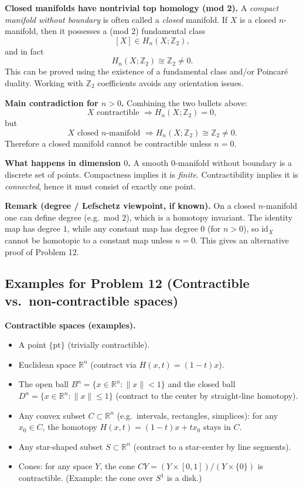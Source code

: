 \documentclass[12pt,a4paper]{article}
\theoremstyle{plain}
\theoremstyle{definition}      %
\begin{document}
\medskip
\noindent\textbf{Closed manifolds have nontrivial top homology (mod 2).}
A \emph{compact manifold without boundary} is often called a \emph{closed} manifold.
If $X$ is a closed $n$-manifold, then it possesses a (mod $2$) fundamental class
\[
[X]\in H_n(X;\mathbb{Z}_2),
\]
and in fact
\[
H_n(X;\mathbb{Z}_2)\cong \mathbb{Z}_2 \neq 0.
\]
This can be proved using the existence of a fundamental class and/or Poincar\'e duality.
Working with $\mathbb{Z}_2$ coefficients avoids any orientation issues.

\medskip
\noindent\textbf{Main contradiction for $n>0$.}
Combining the two bullets above:
\[
X \text{ contractible } \Longrightarrow H_n(X;\mathbb{Z}_2)=0,
\]
but
\[
X \text{ closed $n$-manifold } \Longrightarrow H_n(X;\mathbb{Z}_2)\cong\mathbb{Z}_2\neq 0.
\]
Therefore a closed manifold cannot be contractible unless $n=0$.

\medskip
\noindent\textbf{What happens in dimension $0$.}
A smooth $0$-manifold without boundary is a discrete set of points.
Compactness implies it is \emph{finite}.
Contractibility implies it is \emph{connected}, hence it must consist of exactly one point.

\medskip
\noindent\textbf{Remark (degree / Lefschetz viewpoint, if known).}
On a closed $n$-manifold one can define degree (e.g.\ mod $2$), which is a homotopy invariant.
The identity map has degree $1$, while any constant map has degree $0$ (for $n>0$),
so $\mathrm{id}_X$ cannot be homotopic to a constant map unless $n=0$.
This gives an alternative proof of Problem 12.

\subsection*{Examples for Problem 12 (Contractible vs.\ non-contractible spaces)}

\noindent\textbf{Contractible spaces (examples).}
\begin{itemize}
	\item A point $\{\mathrm{pt}\}$ (trivially contractible).
	\item Euclidean space $\mathbb{R}^n$ (contract via $H(x,t)=(1-t)x$).
	\item The open ball $B^n=\{x\in\mathbb{R}^n:\|x\|<1\}$ and the closed ball
	$D^n=\{x\in\mathbb{R}^n:\|x\|\le 1\}$ (contract to the center by straight-line homotopy).
	\item Any convex subset $C\subset\mathbb{R}^n$ (e.g.\ intervals, rectangles, simplices):
	for any $x_0\in C$, the homotopy $H(x,t)=(1-t)x+tx_0$ stays in $C$.
	\item Any star-shaped subset $S\subset\mathbb{R}^n$ (contract to a star-center by line segments).
	\item Cones: for any space $Y$, the cone
	$CY=(Y\times[0,1])/(Y\times\{0\})$ is contractible.
	(Example: the cone over $S^1$ is a disk.)
\end{itemize}
\end{document}

